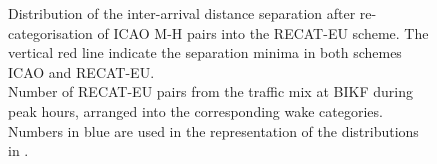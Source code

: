 \begin{figure}[h]
    \centering
    
    \vspace{1cm}
    
    
    \caption[Inter-arrival distance separation of ICAO M-H pairs into the RECAT-EU scheme]{\protect{} Distribution of the inter-arrival distance separation after re-categorisation of ICAO M-H pairs into the RECAT-EU scheme. The vertical red line indicate the separation minima in both schemes ICAO and RECAT-EU.\\ \protect{} Number of RECAT-EU pairs from the traffic mix at BIKF during peak hours, arranged into the corresponding wake categories. Numbers in blue are used in the representation of the distributions in \protect{}.}
    \label{fig:MH_to_RECAT_pairs_dist_separ}
\end{figure}

